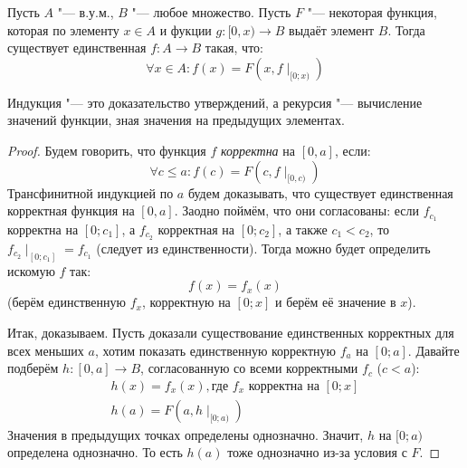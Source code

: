 \begin{theorem}
	Пусть $A$ "--- в.у.м., $B$ "--- любое множество.
	Пусть $F$ "--- некоторая функция, которая по элементу $x \in A$ и
	фукции $g \colon [0, x) \to B$ выдаёт элемент $B$.
	Тогда существует единственная $f \colon A \to B$ такая, что:
	\[ \forall x \in A \colon f(x) = F(x, f\mid_{[0; x)}) \]
\end{theorem}
\begin{Rem}
	Индукция "--- это доказательство утверждений, а рекурсия "--- вычисление значений функции, зная
	значения на предыдущих элементах.
\end{Rem}
\begin{proof}
	Будем говорить, что функция $f$ \textit{корректна} на $[0, a]$, если:
	\[ \forall c \le a \colon f(c) = F(c, f\mid_{[0, c)}) \]
	Трансфинитной индукцией по $a$ будем доказывать, что существует единственная корректная функция на $[0, a]$.
	Заодно поймём, что они согласованы: если $f_{c_1}$ корректна на $[0; c_1]$, а $f_{c_2}$ корректная на $[0; c_2]$,
	а также $c_1 < c_2$, то $f_{c_2}\mid_{[0;c_1]} = f_{c_1}$ (следует из единственности).
	Тогда можно будет определить искомую $f$ так:
	\[ f(x) = f_x(x) \]
	(берём единственную $f_x$, корректную на $[0; x]$ и берём её значение в $x$).

	Итак, доказываем.
	Пусть доказали существование единственных корректных для всех меньших $a$, хотим показать единственную корректную $f_a$ на $[0; a]$.
	Давайте подберём $h \colon [0, a] \to B$, согласованную со всеми корректными $f_c$ ($c < a$):
	\begin{gather*}
		h(x) = f_x(x), \text{где $f_x$ корректна на~}[0; x] \\
		h(a) = F(a, h\mid_{[0;a)})
	\end{gather*}
	Значения в предыдущих точках определены однозначно.
	Значит, $h$ на $[0; a)$ определена однозначно.
	То есть $h(a)$ тоже однозначно из-за условия с $F$.
\end{proof}

